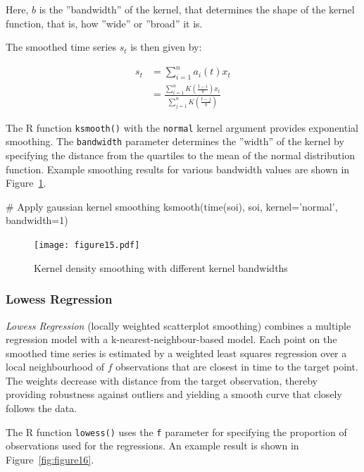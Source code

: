 Here, $b$ is the ''bandwidth'' of the kernel, that determines the shape of the kernel function, that is, how ''wide'' or ''broad'' it is.

The smoothed time series $s_t$ is then given by:

\begin{align*}
s_t &= \sum_{i=1}^n a_i(t) x_t \\
 &= \frac{\sum_{i=1}^n K\left(\frac{t-i}{b}\right) x_t}{\sum_{j=1}^n K \left(\frac{t-j}{b}\right) }
\end{align*}


\noindent The R function \texttt{ksmooth()} with the \texttt{normal} kernel argument provides exponential smoothing. The \texttt{bandwidth} parameter determines the ''width'' of the kernel by specifying the distance from the quartiles to the mean of the normal distribution function. Example smoothing results for various bandwidth values are shown in Figure~\ref{fig:figure15}.

\begin{Rcode}
# Apply gaussian kernel smoothing
ksmooth(time(soi), soi, kernel='normal', bandwidth=1)
\end{Rcode}

\begin{figure}
\centering
\texttt{[image: figure15.pdf]}
\caption{Kernel density smoothing with different kernel bandwidths}
\label{fig:figure15}
\end{figure}

\subsubsection*{Lowess Regression}

\emph{Lowess Regression} (locally weighted scatterplot smoothing) combines a multiple regression model with a k-nearest-neighbour-based model. Each point on the smoothed time series is estimated by a weighted least squares regression over a local neighbourhood of $f$ observations that are closest in time to the target point. The weights decrease with distance from the target observation, thereby providing robustness against outliers and yielding a smooth curve that closely follows the data. 

The R function \texttt{lowess()} uses the \texttt{f} parameter for specifying the proportion of observations used for the regressions. An example result is shown in Figure~\ref{fig:figure16}.

